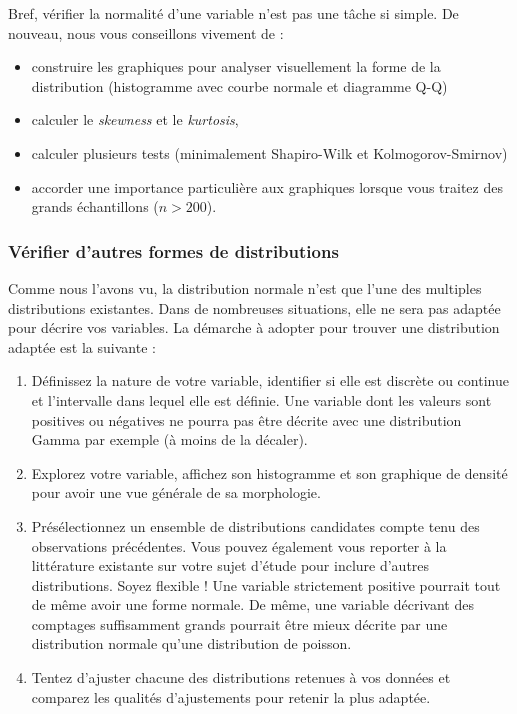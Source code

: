 \documentclass[
  11pt,
  french,
]{book}
\makeatletter
\providecommand{\tightlist}{%
  \setlength{\itemsep}{0pt}\setlength{\parskip}{0pt}}
\newenvironment{kframev}{%
\medskip{}
\setlength{\fboxsep}{.8em}
 \def\at@end@of@kframev{}%
 \ifinner\ifhmode%
  \def\at@end@of@kframev{\end{minipage}}%
  \begin{minipage}{\columnwidth}%
 \fi\fi%
 \def\FrameCommand##1{\hskip\@totalleftmargin \hskip-\fboxsep
 \colorbox{shadebluecolor}{##1}\hskip-\fboxsep
     \hskip-\linewidth \hskip-\@totalleftmargin \hskip\columnwidth}%
 \MakeFramed {\advance\hsize-\width
   \@totalleftmargin\z@ \linewidth\hsize
   \@setminipage}}%
 {\par\unskip\endMakeFramed%
 \at@end@of@kframev}
\newenvironment{rmdblock}[1]
  {
  \begin{itemize}
  \renewcommand{\labelitemi}{
    \raisebox{-.7\height}[0pt][0pt]{
      {\setkeys{Gin}{width=3em,keepaspectratio}\texttt{[image: images/\#1]}}
    }
  }
  \setlength{\fboxsep}{1em}
  \begin{kframev}
  \small
  \item
  }
  {
  \end{kframev}
  \end{itemize}
  }
\newenvironment{bloc_astuce}
  {\begin{rmdblock}{astuce}}
  {\end{rmdblock}}
\makeatother
\begin{document}
\begin{bloc_astuce}

Bref, vérifier la normalité d'une variable n'est pas une tâche si simple. De nouveau, nous vous conseillons vivement de :

\begin{itemize}
\tightlist
\item
  construire les graphiques pour analyser visuellement la forme de la distribution (histogramme avec courbe normale et diagramme Q-Q)
\item
  calculer le \emph{skewness} et le \emph{kurtosis},
\item
  calculer plusieurs tests (minimalement Shapiro-Wilk et Kolmogorov-Smirnov)
\item
  accorder une importance particulière aux graphiques lorsque vous traitez des grands échantillons (\(n>200\)).
\end{itemize}

\end{bloc_astuce}

\hypertarget{vuxe9rifier-dautres-formes-de-distributions}{%
\subsubsection{Vérifier d'autres formes de distributions}\label{vuxe9rifier-dautres-formes-de-distributions}}

Comme nous l'avons vu, la distribution normale n'est que l'une des multiples distributions existantes. Dans de nombreuses situations, elle ne sera pas adaptée pour décrire vos variables. La démarche à adopter pour trouver une distribution adaptée est la suivante :

\begin{enumerate}
\def\labelenumi{\arabic{enumi}.}
\tightlist
\item
  Définissez la nature de votre variable, identifier si elle est discrète ou continue et l'intervalle dans lequel elle est définie. Une variable dont les valeurs sont positives ou négatives ne pourra pas être décrite avec une distribution Gamma par exemple (à moins de la décaler).
\item
  Explorez votre variable, affichez son histogramme et son graphique de densité pour avoir une vue générale de sa morphologie.
\item
  Présélectionnez un ensemble de distributions candidates compte tenu des observations précédentes. Vous pouvez également vous reporter à la littérature existante sur votre sujet d'étude pour inclure d'autres distributions. Soyez flexible ! Une variable strictement positive pourrait tout de même avoir une forme normale. De même, une variable décrivant des comptages suffisamment grands pourrait être mieux décrite par une distribution normale qu'une distribution de poisson.
\item
  Tentez d'ajuster chacune des distributions retenues à vos données et comparez les qualités d'ajustements pour retenir la plus adaptée.
\end{enumerate}
\end{document}
